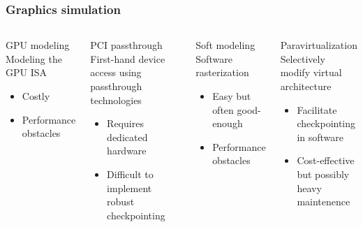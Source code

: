 \begin{frame}
  \frametitle{Graphics simulation}

  \begin{columns}
    \begin{block}{GPU modeling}
      Modeling the GPU ISA
      \begin{itemize}
      \item Costly
      \item Performance obstacles
      \end{itemize}
    \end{block}
    \begin{block}{PCI passthrough}
      First-hand device access using passthrough technologies
      \begin{itemize}
      \item Requires dedicated hardware\phantom{     }
      \item Difficult to implement robust checkpointing
      \end{itemize}
    \end{block}
    \begin{block}{Soft modeling}
      Software rasterization
      \begin{itemize}
      \item Easy but often good-enough
      \item Performance obstacles
      \end{itemize}
    \end{block}
    \begin{block}{Paravirtualization}
      Selectively modify virtual architecture
      \begin{itemize}
      \item Facilitate checkpointing in software
      \item Cost-effective but possibly heavy maintenence
      \end{itemize}
    \end{block}
  \end{columns}
  
\end{frame}
